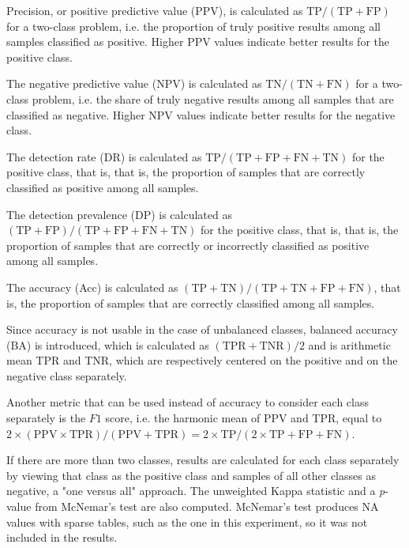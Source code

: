 \documentclass[sn-mathphys-num]{sn-jnl}%
\begin{document}
Precision, or positive predictive value (PPV), is calculated as $\mathrm{TP}/(\mathrm{TP}+\mathrm{FP})$ for a two-class problem, i.e. the proportion of truly positive results among all samples classified as positive. 
Higher PPV values indicate better results for the positive class.

The negative predictive value (NPV) is calculated as $\mathrm{TN}/(\mathrm{TN}+\mathrm{FN})$ for a two-class problem, i.e. the share of truly negative results among all samples that are classified as negative. Higher NPV values indicate better results for the negative class.

The detection rate (DR) is calculated as $\mathrm{TP}/(\mathrm{TP}+\mathrm{FP}+\mathrm{FN}+\mathrm{TN})$ for the positive class, that is, that is, the proportion of samples that are correctly classified as positive among all samples.

The detection prevalence (DP) is calculated as $(\mathrm{TP}+\mathrm{FP})/(\mathrm{TP}+\mathrm{FP}+\mathrm{FN}+\mathrm{TN})$ for the positive class, that is, that is, the proportion of samples that are correctly or incorrectly classified as positive among all samples.

The accuracy (Acc) is calculated as $(\mathrm{TP} + \mathrm{TN}) / (\mathrm{TP} + \mathrm{TN} + \mathrm{FP} + \mathrm{FN})$, that is, the proportion of samples that are correctly classified among all samples.

Since accuracy is not usable in the case of unbalanced classes, balanced accuracy (BA) is introduced, which is calculated as $(\mathrm{TPR} + \mathrm{TNR}) / 2$ and is arithmetic mean TPR and TNR, which are respectively centered on the positive and on the negative class separately.

Another metric that can be used instead of accuracy to consider each class separately is the $F1$ score, i.e. the harmonic mean of PPV and TPR, equal to $2 \times (\mathrm{PPV} \times \mathrm{TPR}) / (\mathrm{PPV} + \mathrm{TPR}) = 2 \times \mathrm{TP} / (2 \times \mathrm{TP} + \mathrm{FP} + \mathrm{FN})$.

If there are more than two classes, results are calculated for each class separately by viewing that class as the positive class and samples of all other classes as negative, a "one versus all" approach.
The unweighted Kappa statistic and a \textit{p}-value from McNemar's test are also computed. McNemar's test produces NA values with sparse tables, such as the one in this experiment, so it was not included in the results.
\end{document}
